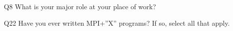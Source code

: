 \begin{description}%
\item{Q8} What is your major role at your place of work?%
\item{Q22} Have you ever written MPI+”X” programs? If so, select all that apply.%
\end{description}%
